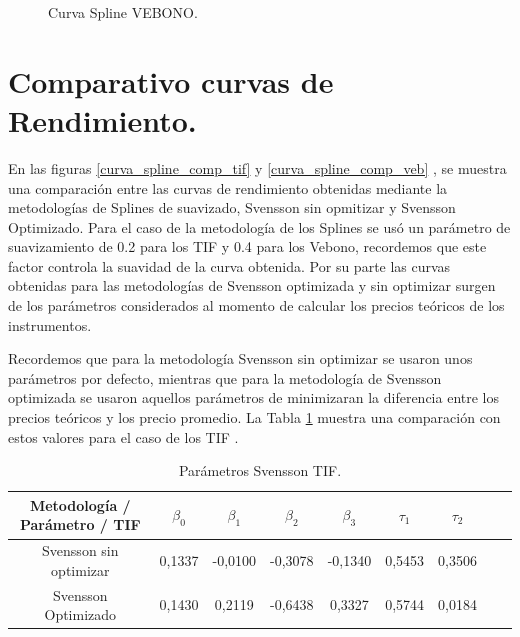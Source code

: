 \begin{figure}[h]
\caption{Curva Spline VEBONO.}
\label{curva_spline_veb}
\end{figure}

\newpage

\section{Comparativo curvas de Rendimiento.}

\hspace{0.4cm} En las figuras \ref{curva_spline_comp_tif} y \ref{curva_spline_comp_veb} , se muestra una comparaci\'on entre las curvas de rendimiento obtenidas mediante la metodolog\'ias de Splines de suavizado, Svensson sin opmitizar y Svensson Optimizado.
Para el caso de la metodolog\'ia de los Splines se us\'o un par\'ametro de suavizamiento de 0.2 para los TIF y 0.4 para los Vebono, recordemos que este factor controla la suavidad de la curva obtenida. Por su parte las curvas obtenidas para las metodolog\'ias de Svensson optimizada y sin optimizar surgen de los par\'ametros considerados al momento de calcular los precios te\'oricos de los instrumentos.

\hspace{0.4cm}Recordemos que para la metodolog\'ia Svensson sin optimizar se usaron unos par\'ametros por defecto, mientras que para la metodolog\'ia de Svensson optimizada se usaron aquellos par\'ametros de minimizaran la diferencia entre los precios te\'oricos y los precio promedio. La Tabla \ref{tabla4} muestra una comparaci\'on con estos valores para el caso de los TIF .

\begin{table}[H]
\centering
{\begin{tabular}[t]{|c |c |c |c |c |c |c |c |r|}
\hline
Metodolog\'ia / Par\'ametro / TIF & $\beta_{0}$ & $\beta_{1}$ & $\beta_{2}$ & $\beta_{3}$  &  $\tau_{1}$ & $\tau_{2}$ \\
\hline
Svensson sin optimizar & 0,1337 & -0,0100 & -0,3078 & -0,1340  & 0,5453 & 0,3506\\
\hline
Svensson Optimizado & 0,1430 & 0,2119 & -0,6438 & 0,3327 & 0,5744 & 0,0184 \\
\hline
\end{tabular}}
\caption{Par\'ametros Svensson TIF.}
\label{tabla4}
\end{table}



